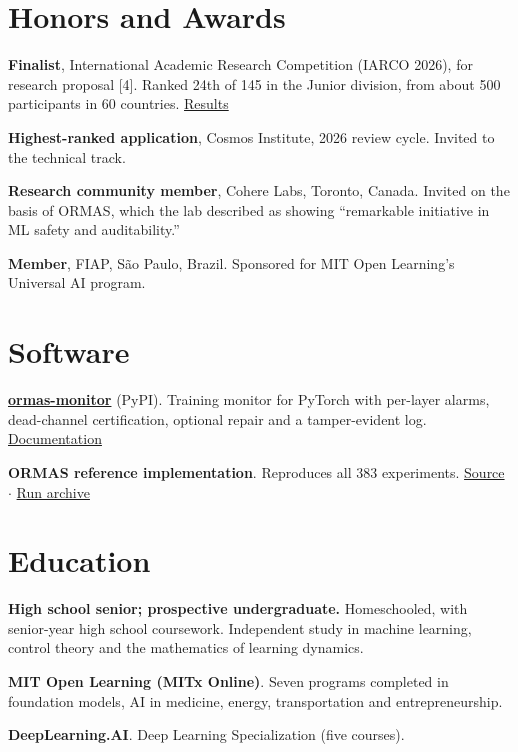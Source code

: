 \documentclass[10pt,a4paper]{article}
\newcommand{\cvitem}[3]{%
  \begin{list}{}{%
    \setlength{\leftmargin}{2.35cm}%
    \setlength{\labelwidth}{2.1cm}%
    \setlength{\labelsep}{0.25cm}%
    \setlength{\itemindent}{0pt}%
    \setlength{\listparindent}{0pt}%
    \setlength{\rightmargin}{0pt}%
    \setlength{\topsep}{0pt}%
    \setlength{\partopsep}{0pt}%
    \setlength{\parsep}{0pt}%
    \setlength{\itemsep}{0pt}%
  }%
  \item[{\makebox[2.1cm][l]{\footnotesize\color{muted}#1}}]%
  #2
  #3
  \end{list}%
  \vspace{1pt}
}
\begin{document}
\section*{Honors and Awards}
\cvitem{2026}{\textbf{Finalist}, International Academic Research Competition (IARCO 2026), for research proposal [4]. Ranked 24th of 145 in the Junior division, from about 500 participants in 60 countries. \href{https://iarco.org/2026-winners}{Results}}{}
\cvitem{2026}{\textbf{Highest-ranked application}, Cosmos Institute, 2026 review cycle. Invited to the technical track.}{}
\cvitem{2026}{\textbf{Research community member}, Cohere Labs, Toronto, Canada. Invited on the basis of ORMAS, which the lab described as showing ``remarkable initiative in ML safety and auditability.''}{}
\cvitem{2026}{\textbf{Member}, FIAP, S\~ao Paulo, Brazil. Sponsored for MIT Open Learning's Universal AI program.}{}

\section*{Software}
\cvitem{2026}{\textbf{\href{https://pypi.org/project/ormas-monitor/}{ormas-monitor}} (PyPI). Training monitor for PyTorch with per-layer alarms, dead-channel certification, optional repair and a tamper-evident log. \href{https://oxiedo.github.io/ormas-monitor/}{Documentation}}{}
\cvitem{2026}{\textbf{ORMAS reference implementation}. Reproduces all 383 experiments. \href{https://anonymous.4open.science/r/ormas-EB73/README.md}{Source} $\cdot$ \href{https://drive.google.com/file/d/1CDaMIpTZ_8Mkot9D-O7JU29mDopq_Bdl/view}{Run archive}}{}

\section*{Education}
\cvitem{present}{\textbf{High school senior; prospective undergraduate.} Homeschooled, with senior-year high school coursework. Independent study in machine learning, control theory and the mathematics of learning dynamics.}{}
\cvitem{2025--2026}{\textbf{MIT Open Learning (MITx Online)}. Seven programs completed in foundation models, AI in medicine, energy, transportation and entrepreneurship.}{}
\cvitem{2025--2026}{\textbf{DeepLearning.AI}. Deep Learning Specialization (five courses).}{}
\end{document}
